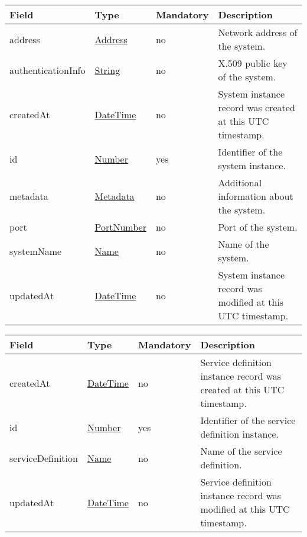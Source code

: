 \documentclass[a4paper]{arrowhead}
\newcommand{\pref}[1]{{\textcolor{ArrowheadGrey}{\hyperref[sec:model:primitives:#1]{#1}}}}
\begin{document}
\clearpage

\label{sec:model:SystemRecord}

\begin{table}[ht!]
\begin{tabularx}{\textwidth}{| p{4cm} | p{4cm} | p{2cm} | X |} \hline
\rowcolor{gray!33} Field & Type & Mandatory & Description \\ \hline

address &\pref{Address} & no & Network address of the system. \\ \hline
authenticationInfo &\pref{String} & no & X.509 public key of the system. \\ \hline
createdAt & \pref{DateTime} & no & System instance record was created at this UTC time\-stamp. \\ \hline
id & \pref{Number} & yes & Identifier of the system instance. \\ \hline
metadata &\hyperref[sec:model:Metadata]{Metadata} & no & Additional information about the system. \\ \hline
port &\pref{PortNumber} & no & Port of the system. \\ \hline
systemName &\pref{Name} & no & Name of the system. \\ \hline
updatedAt & \pref{DateTime} & no & System instance record was modified at this UTC time\-stamp. \\ \hline
\end{tabularx}
\end{table}

\label{sec:model:ServiceDefinitionRecord}

\begin{table}[ht!]
\begin{tabularx}{\textwidth}{| p{4cm} | p{4cm} | p{2cm} | X |} \hline
\rowcolor{gray!33} Field & Type & Mandatory & Description \\ \hline
createdAt & \pref{DateTime} & no & Service definition instance record was created at this UTC time\-stamp. \\ \hline
id & \pref{Number} & yes & Identifier of the service definition instance. \\ \hline
serviceDefinition &\pref{Name} & no  & Name of the service definition. \\ \hline
updatedAt & \pref{DateTime} & no & Service definition instance record was modified at this UTC time\-stamp. \\ \hline
\end{tabularx}
\end{table}
\end{document}
